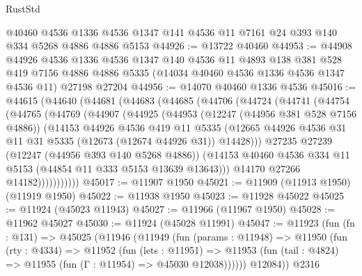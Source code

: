 \begin{lexlean}{RustStd}
\begin{coremodule}
{\begin{coremodule}
{{{{{{{{{{{{{{{{{{{{{{{{{{{{{{{{{{{{{{{{{{{{{{{{{{{{{{{{{{{{{{{{{{{{{{{{{{{{{{{{    @40460
    @4536
    @1336
    @4536
    @1347
    @141
    @4536
    @11
    @7161
    @24
    @393
    @140
    @334
    @5268
    @4886
    @4886
    @5153
@44926 := @13722 @40460
@44953 := @44908
    @44926
    @4536
    @1336
    @4536
    @1347
    @140
    @4536
    @11
    @4893
    @138
    @381
    @528
    @419
    @7156
    @4886
    @4886
    @5335
    (@14034 @40460 @4536 @1336 @4536 @1347 @4536 @11)
    @27198
    @27204
@44956 := @14070 @40460 @1336 @4536
@45016 := @44615
    (@44640
      (@44681
        (@44683
          (@44685
            (@44706
              (@44724
                (@44741
                  (@44754
                    (@44765
                      (@44769
                        (@44907
                          (@44925
                            (@44953
                              (@12247 (@44956 @381 @528 @7156 @4886))
                              (@14153
                                @44926
                                @4536
                                @419
                                @11
                                @5335
                                (@12665
                                  @44926
                                  @4536
                                  @31
                                  @11
                                  @31
                                  @5335
                                  (@12673 (@12674 @44926 @31))
                                  @14428)))
                            @27235
                            @27239
                            (@12247 (@44956 @393 @140 @5268 @4886))
                            (@14153
                              @40460
                              @4536
                              @334
                              @11
                              @5153
                              (@44854 @11 @333 @5153 @13639 @13643)))
                          @14170
                          @27266
                          @14182)))))))))))
@45017 := @11907 @1950
@45021 := @11909 (@11913 @1950) (@11919 @1950)
@45022 := @11938 @1950
@45023 := @11928 @45022
@45025 := @11924 (@45023 @11943)
@45027 := @11966 (@11967 @1950)
@45028 := @11962 @45027
@45030 := @11924 (@45028 @11991)
@45047 := @11923
    (fun (fn : @131) =>
    @45025
      (@11946
        (@11949
          (fun (params : @11948) =>
          @11950
            (fun (rty : @4334) =>
            @11952
              (fun (lets : @11951) =>
              @11953 (fun (tail : @4824) => @11955 (fun (Γ : @11954) => @45030 @12038))))))
        @12084))
    @2316
}}}}}}}}}}}}}}}}}}}}}}}}}}}}}}}}}}}}}}}}}}}}}}}}}}}}}}}}}}}}}}}}}}}}}}}}}}}}}}}}
\end{coremodule}}
\end{coremodule}
\end{lexlean}
